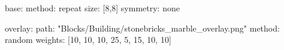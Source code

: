 base:
  method: repeat
  size: [8,8]
  symmetry: none

overlay:
  path: "Blocks/Building/stonebricks_marble_overlay.png"
  method: random
  weights: [10, 10, 10, 25, 5, 15, 10, 10]